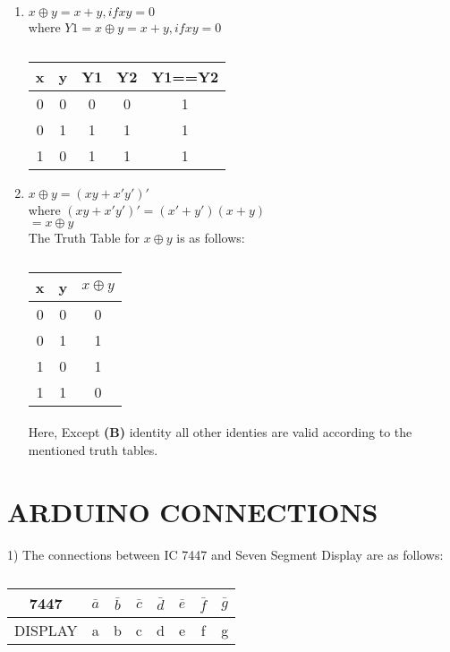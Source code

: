 \documentclass[a4paper,11pt,twocolumn]{article}
\begin{document}
\begin{enumerate}[label=\textbf{(\Alph*})]
	\item \textbf{$x\oplus y = x + y, if xy = 0 $} \\
where $Y1=x\oplus y=x+y, if xy=0$\\
\bigskip
\begin{table}[ht!]
	\centering
\begin{tabular}{ |c |c |c |c |c |} 
\hline 
\newline 
\textbf{x} & \textbf{y} & \textbf{Y1} & \textbf{Y2} & \textbf{Y1==Y2} \\ 
\hline 
	0 & 0 & 0 &0 &1\\   
	0 & 1 & 1 &1 &1\\  
	1 & 0 & 1 &1 &1\\    
 \hline 
 \end{tabular}
	\caption{}
\end{table}
\bigskip

	\item \textbf{$ x\oplus y = (xy + x'y')'$}\\
		where $(xy+x'y')'=(x'+y')(x+y)$\\
		      $=x\oplus y$\\
The Truth Table for $x\oplus y$ is as follows:\\
\begin{table}[ht!]
	\centering
	\begin{tabular}{ |c |c |c |} 
\hline 
\newline 
\textbf{x} & \textbf{y} & \textbf{$x\oplus y$} \\ 
\hline 
 0 & 0 & 0\\   
 0 & 1 & 1\\  
 1 & 0 & 1\\  
 1 & 1 & 0\\  
 \hline 
 \end{tabular}
	\caption{}
\end{table}
\bigskip

\paragraph{}
	Here, Except \textbf{(B)} identity all other identies are valid according to the mentioned truth tables.
\end{enumerate}
\bigskip

\section{ARDUINO CONNECTIONS}

1) The connections between IC 7447 and Seven Segment Display are as follows:
\begin{table}[ht!] 
    \centering 
    \begin{tabular}{|c|c|c|c|c|c|c|c|} 
    \hline 
       7447& $\bar a$&$\bar b$&$\bar c$&$\bar d$&$\bar e$&$\bar f$&$\bar g  $ \\ 
       \hline 
    DISPLAY& a&b&c&d&e&f&g \\ 
    \hline 
    \end{tabular} 
    \caption{} 
\end{table} 
\\
\end{document}
